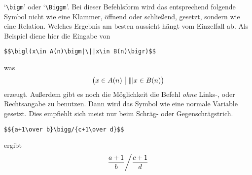 `\verb|\bigm|' oder `\verb|\Biggm|'.
Bei dieser Befehlsform wird das entsprechend folgende Symbol nicht wie
eine Klammer, \"offnend oder schlie\ss{}end, gesetzt, sondern wie eine
Relation. Welches Ergebnis am besten aussieht h\"angt vom Einzelfall ab.
Als Beispiel diene hier die Eingabe von
\begin{verbatim}
$$\bigl(x\in A(n)\bigm|\||x\in B(n)\bigr)$$
\end{verbatim}
was
\[\bigl(x\in A(n)\bigm|\||x\in B(n)\bigr)\]
erzeugt. Au\ss{}erdem gibt es noch die M\"oglichkeit die Befehl {\em ohne}
Links-, oder Rechtsangabe zu benutzen. Dann wird das Symbol wie eine
normale Variable gesetzt. Dies empfiehlt sich meist nur beim Schr\"ag-
oder Gegenschr\"agstrich.
\begin{verbatim}
$${a+1\over b}\bigg/{c+1\over d}$$
\end{verbatim}
ergibt
$${a+1\over b}\bigg/{c+1\over d}$$
